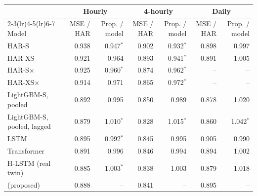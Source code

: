 
\begin{tabular}{@{}lrrrrrr@{}}
\toprule
 & \multicolumn{2}{c}{Hourly} & \multicolumn{2}{c}{4-hourly} & \multicolumn{2}{c}{Daily} \\
\cmidrule(lr){2-3}\cmidrule(lr){4-5}\cmidrule(lr){6-7}
Model & MSE / HAR & Prop. / model & MSE / HAR & Prop. / model & MSE / HAR & Prop. / model \\
\midrule
HAR-S & 0.938 & 0.947$^{*}$ & 0.902 & 0.932$^{*}$ & 0.898 & 0.997 \\
HAR-XS & 0.921 & 0.964 & 0.893 & 0.941$^{*}$ & 0.891 & 1.005 \\
HAR-S$\times$ & 0.925 & 0.960$^{*}$ & 0.874 & 0.962$^{*}$ & -- & -- \\
HAR-XS$\times$ & 0.914 & 0.971 & 0.865 & 0.972$^{*}$ & -- & -- \\
LightGBM-S, pooled & 0.892 & 0.995 & 0.850 & 0.989 & 0.878 & 1.020 \\
LightGBM-S, pooled, lagged & 0.879 & 1.010$^{*}$ & 0.828 & 1.015$^{*}$ & 0.860 & 1.042$^{*}$ \\
LSTM & 0.895 & 0.992$^{*}$ & 0.845 & 0.995 & 0.905 & 0.990 \\
Transformer & 0.891 & 0.996 & 0.846 & 0.994 & 0.894 & 1.002 \\
H-LSTM (real twin) & 0.885 & 1.003$^{*}$ & 0.838 & 1.003 & 0.879 & 1.018 \\
\HQ{} (proposed) & 0.888 & -- & 0.841 & -- & 0.895 & -- \\
\bottomrule
\end{tabular}
